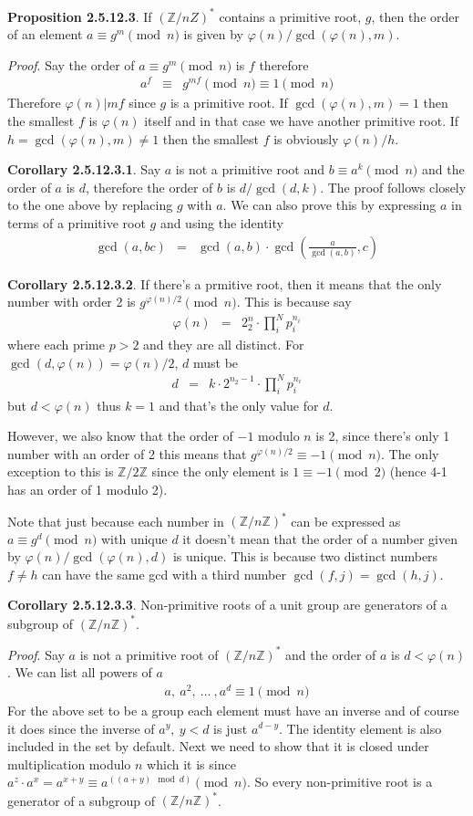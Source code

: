 \documentclass[aps,preprint,preprintnumbers,nofootinbib,showpacs,prd]{revtex4-1}
\newcommand{\nbea}{\begin{eqnarray*}}
\newcommand{\neea}{\end{eqnarray*}}
\begin{document}
{\bf Proposition 2.5.12.3}.  If $(\mathbb{Z}/n{Z})^*$ contains a primitive root, $g$, then the order of an element $a \equiv g^m \pmod{n}$ is given by $\varphi(n)/\gcd(\varphi(n),m)$.

{\it Proof}. Say the order of $a \equiv g^m \pmod{n}$ is $f$ therefore
%
\nbea
a^{f} & \equiv & g^{mf} \pmod{n} \equiv 1 \pmod{n}
\neea
%
Therefore $\varphi(n)|mf$ since $g$ is a primitive root. If $\gcd(\varphi(n),m) = 1$ then the smallest $f$ is $\varphi(n)$ itself and in that case we have another primitive root. If $h=\gcd(\varphi(n),m) \neq 1$ then the smallest $f$ is obviously $\varphi(n)/h$.

{\bf Corollary 2.5.12.3.1}. Say $a$ is not a primitive root and $b \equiv a^k \pmod{n}$ and the order of $a$ is $d$, therefore the order of $b$ is $d/\gcd(d,k)$. The proof follows closely to the one above by replacing $g$ with $a$. We can also prove this by expressing $a$ in terms of a primitive root $g$ and using the identity
%
\nbea
\gcd(a,bc) & = & \gcd(a,b) \cdot \gcd\left ( \frac{a}{\gcd(a,b)}, c \right )
\neea
%

{\bf Corollary 2.5.12.3.2}. If there's a prmitive root, then it means that the only number with order 2 is $g^{\varphi(n)/2}\pmod{n}$. This is because say
%
\nbea
\varphi(n) & = & 2^n_2 \cdot \prod_i^{N} p_i^{n_i}
\neea
%
where each prime $p > 2$ and they are all distinct. For $\gcd(d, \varphi(n)) = \varphi(n)/2$, $d$ must be
%
\nbea
d & = & k\cdot 2^{n_2-1} \cdot \prod_i^{N} p_i^{n_i}
\neea
%
but $d < \varphi(n)$ thus $k=1$ and that's the only value for $d$.

However, we also know that the order of $-1$ modulo $n$ is 2, since there's only 1 number with an order of 2 this means that $g^{\varphi(n)/2} \equiv -1 \pmod{n}$. The only exception to this is $\mathbb{Z}/2\mathbb{Z}$ since the only element is $1\equiv-1\pmod{2}$ (hence 4-1 has an order of 1 modulo 2).

Note that just because each number in $(\mathbb{Z}/n\mathbb{Z})^*$ can be expressed as $a \equiv g^d \pmod{n}$ with unique $d$ it doesn't mean that the order of a number given by $\varphi(n)/\gcd(\varphi(n),d)$ is unique. This is because two distinct numbers $f\neq h$ can have the same gcd with a third number $\gcd(f,j) = \gcd(h,j)$.

{\bf Corollary 2.5.12.3.3}. Non-primitive roots of a unit group are generators of a subgroup of $(\mathbb{Z}/n\mathbb{Z})^*$.

{\it Proof}. Say $a$ is not a primitive root of $(\mathbb{Z}/n\mathbb{Z})^*$ and the order of $a$ is $d < \varphi(n)$. We can list all powers of $a$
%
\nbea
a,~a^2,~\dots~, a^d \equiv 1 \pmod{n}
\neea
%
For the above set to be a group each element must have an inverse and of course it does since the inverse of $a^y, ~ y < d$ is just $a^{d-y}$. The identity element is also included in the set by default. Next we need to show that it is closed under multiplication modulo $n$ which it is since $a^z \cdot a^x = a^{x+y} \equiv a^{((a+y) \mod d)} \pmod{n}$. So every non-primitive root is a generator of a subgroup of $(\mathbb{Z}/n\mathbb{Z})^*$.
\end{document}

